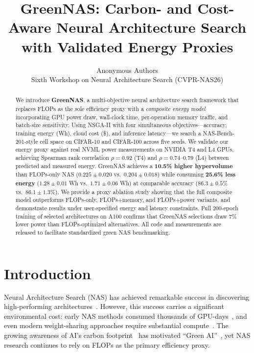 \documentclass[10pt,twocolumn,letterpaper]{article}
\begin{document}
\title{GreenNAS: Carbon- and Cost-Aware Neural Architecture Search\\with Validated Energy Proxies}

\author{
Anonymous Authors\\
{\small Sixth Workshop on Neural Architecture Search (CVPR-NAS26)}
}

\maketitle

\begin{abstract}
We introduce \textbf{GreenNAS}, a multi-objective neural architecture search framework that replaces FLOPs as the sole efficiency proxy with a \emph{composite energy model} incorporating GPU power draw, wall-clock time, per-operation memory traffic, and batch-size sensitivity. Using NSGA-II with four simultaneous objectives---accuracy, training energy (Wh), cloud cost (\$), and inference latency---we search a NAS-Bench-201-style cell space on CIFAR-10 and CIFAR-100 across five seeds. We validate our energy proxy against real NVML power measurements on NVIDIA T4 and L4 GPUs, achieving Spearman rank correlation $\rho = 0.92$ (T4) and $\rho = 0.74$--$0.79$ (L4) between predicted and measured energy. GreenNAS achieves a \textbf{10.5\% higher hypervolume} than FLOPs-only NAS ($0.225 \pm 0.020$ vs.\ $0.204 \pm 0.018$) while consuming \textbf{25.6\% less energy} ($1.28 \pm 0.01$ Wh vs.\ $1.71 \pm 0.06$ Wh) at comparable accuracy ($86.3 \pm 0.5$\% vs.\ $86.1 \pm 1.3$\%). We provide a proxy ablation study showing that the full composite model outperforms FLOPs-only, FLOPs+memory, and FLOPs+power variants, and demonstrate results under user-specified energy and latency constraints. Full 200-epoch training of selected architectures on A100 confirms that GreenNAS selections draw 7\% lower power than FLOPs-optimized alternatives. All code and measurements are released to facilitate standardized green NAS benchmarking.
\end{abstract}

\section{Introduction}
\label{sec:intro}

Neural Architecture Search (NAS) has achieved remarkable success in discovering high-performing architectures~\cite{zoph2017neural,pham2018efficient,liu2019darts,elsken2019survey}. However, this success carries a significant environmental cost: early NAS methods consumed thousands of GPU-days~\cite{zoph2017neural}, and even modern weight-sharing approaches require substantial compute~\cite{pham2018efficient}. The growing awareness of AI's carbon footprint~\cite{strubell2019energy,schwartz2020green,henderson2020systematic,luccioni2023bloom} has motivated ``Green AI''~\cite{schwartz2020green}, yet NAS research continues to rely on FLOPs as the primary efficiency proxy.
\end{document}
